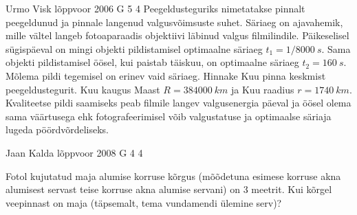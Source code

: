 \documentclass[11pt, twoside]{article}
\begin{document}
{%
{Urmo Visk} %
{lõppvoor} %
{2006} %
{G 5} %
{4} %
{
\ifStatement
Peegeldusteguriks nimetatakse pinnalt peegeldunud ja pinnale langenud valgusvõimsuste suhet. Säriaeg on ajavahemik, mille vältel langeb fotoaparaadis objektiivi läbinud valgus filmilindile. Päikeselisel sügispäeval on mingi objekti pildistamisel optimaalne säriaeg $t_1 = 1/\SI{8000}{s}$. Sama objekti pildistamisel öösel, kui paistab täiskuu, on optimaalne säriaeg $t_2 = \SI{160}{s}$. Mõlema pildi tegemisel on erinev vaid säriaeg. Hinnake Kuu pinna keskmist peegeldustegurit. Kuu kaugus Maast $R = \SI{384000}{km}$ ja Kuu raadius $r = \SI{1740}{km}$. Kvaliteetse pildi saamiseks peab filmile langev valgusenergia päeval ja öösel olema sama väärtusega ehk fotografeerimisel võib valgustatuse ja optimaalse säriaja lugeda pöördvõrdeliseks.
\fi
}

{Jaan Kalda} %
{lõppvoor} %
{2008} %
{G 4} %
{4} %
{
\ifStatement
Fotol kujutatud maja alumise korruse kõrgus (mõõdetuna esimese korruse akna alumisest servast teise korruse akna alumise servani) on 3 meetrit. Kui kõrgel veepinnast on maja (täpsemalt, tema vundamendi ülemine serv)?

}}
\end{document}
